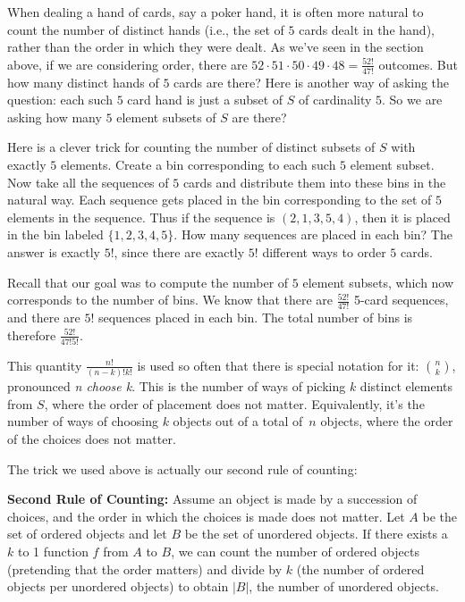 \documentclass[11pt,fleqn]{article}
\begin{document}
When dealing a hand of cards, say a poker hand, it is often more 
natural to count the number of distinct hands (i.e., the set 
of $5$ cards dealt in the hand), rather than the order in 
which they were dealt. As we've seen
in the section above, if we are considering order, there are $52\cdot 51\cdot 50\cdot 49 \cdot 48 = \frac{52!}{47!}$
outcomes. But how many distinct hands of $5$ cards are there? Here is another way of asking the question:
each such $5$ card hand is just a subset of $S$ of cardinality $5$. So we are asking how many $5$ element
subsets of $S$ are there?

Here is a clever trick for counting the number of distinct subsets of $S$ with exactly $5$ elements.
Create a bin corresponding to each such $5$ element subset. Now 
take all the sequences of $5$ cards and distribute them into these bins in the natural way. 
Each sequence gets placed in the bin corresponding to the set of $5$ elements in the sequence. 
Thus if the sequence is $(2,1, 3, 5, 4)$, then it is placed in the bin labeled $\{1, 2, 3, 4, 5\}$. 
How many sequences are placed in each bin? The answer is exactly $5!$, since there are exactly
$5!$ different ways to order $5$ cards. 

Recall that our goal was to compute the number of $5$ element subsets, which now corresponds
to the number of bins. We know that there are $\frac{52!}{47!}$ 5-card sequences, and there are $5!$ sequences
placed in each bin. The total number of bins is therefore $\frac{52!}{47!5!}$. 

This quantity $\frac{n!}{(n-k)!k!}$ is used so often that there
is special notation for it: $n \choose k$, pronounced {\em n choose k}.
This is the number of ways of picking $k$ distinct elements from $S$,
where the order of placement does not matter. 
Equivalently, it's the number of ways of choosing $k$ objects
out of a total of~$n$ objects, where the order of the choices does
not matter.

The trick we used above is actually our second rule of counting: 

\noindent
{\bf Second Rule of Counting:}
Assume an object is made by a succession of choices, and the order
in which the choices is made does not matter. Let $A$ be the
set of ordered objects and let $B$ be the set of unordered objects.
If there exists a $k$ to 1 function $f$ from $A$ to $B$, 
we can count the number of ordered objects (pretending that the order matters)
and divide by $k$ (the number of ordered objects per unordered objects) to obtain $|B|$,
the number of unordered objects.
\end{document}
